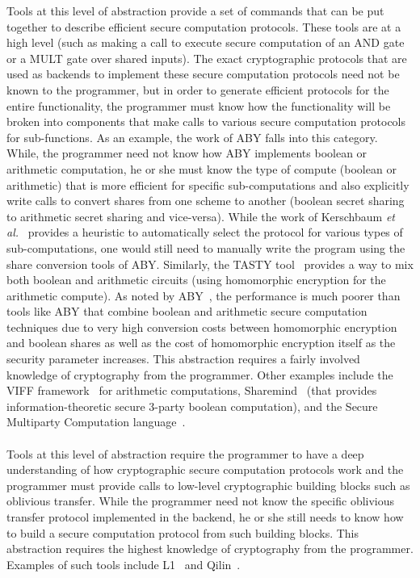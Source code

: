  Tools at this level of abstraction provide a set of commands that can be put together to describe efficient secure computation protocols. These tools are at a high level (such as making a call to execute secure computation of an AND gate or a MULT gate over shared inputs). The exact cryptographic protocols that are used as backends to implement these secure computation protocols need not be known to the programmer, but in order to generate efficient protocols for the entire functionality, the programmer must know how the functionality will be broken into components that make calls to various secure computation protocols for sub-functions. As an example, the work of ABY \cite{aby} falls into this category. While, the programmer need not know how ABY implements boolean or arithmetic computation, he or she must know the type of compute (boolean or arithmetic) that is more efficient for specific sub-computations and also explicitly write calls to convert shares from one scheme to another (boolean secret sharing to arithmetic secret sharing and vice-versa). While the work of Kerschbaum {\em et al.}~\cite{kos14} provides a heuristic to automatically select the protocol for various types of sub-computations, one would still need to manually write the program using the share conversion tools of ABY. Similarly, the TASTY tool~\cite{tasty} provides a way to mix both boolean and arithmetic circuits (using homomorphic encryption for the arithmetic compute). As noted by ABY~\cite{aby}, the performance is much poorer than tools like ABY that combine boolean and arithmetic secure computation techniques due to very high conversion costs between homomorphic encryption and boolean shares as well as the cost of homomorphic encryption itself as the security parameter increases. This abstraction requires a fairly involved knowledge of cryptography from the programmer. Other examples include the VIFF framework~\cite{viff} for arithmetic computations, Sharemind~\cite{sharemind} (that provides information-theoretic secure 3-party boolean computation), and the Secure Multiparty Computation language~\cite{nsy04,securemc}. 
\\\\
 Tools at this level of abstraction require the programmer to have a deep understanding of how cryptographic secure computation protocols work and the programmer must provide calls to low-level cryptographic building blocks such as oblivious transfer. While the programmer need not know the specific oblivious transfer protocol implemented in the backend, he or she still needs to know how to build a secure computation protocol from such building blocks. This abstraction requires the highest knowledge of cryptography from the programmer. Examples of such tools include L1~\cite{l1} and Qilin~\cite{qilin}.


